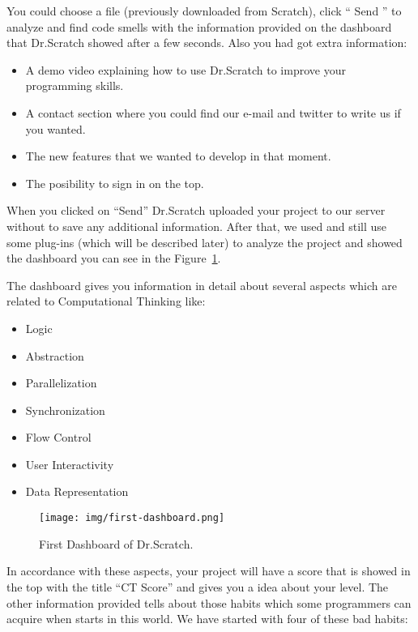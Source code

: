 \documentclass[a4paper, 12pt]{book}
\begin{document}
You could choose a file (previously downloaded from Scratch), click
`` Send '' to analyze and find code smells with the information 
provided on the dashboard that Dr.Scratch showed  after a few seconds.
Also you had got extra information:

\begin{itemize}
   	\item A demo video explaining how to use Dr.Scratch to improve your 
   	programming skills.
   	\item A contact section where you could find our e-mail and twitter to write
   	us if you wanted.
	\item The new features that we wanted to develop in that moment.
	\item The posibility to sign in on the top.
\end{itemize}

When you clicked on ``Send'' Dr.Scratch uploaded your project to our server
without to save any additional information. After that, we used and
still use some plug-ins (which will be described later) to analyze the 
project and showed the dashboard you can see in the 
Figure~\ref{figure:first-dashboard}.

The dashboard gives you information in detail about several aspects which are
related to Computational Thinking like: 

\begin{itemize}
   	\item Logic
   	\item Abstraction
	\item Parallelization
	\item Synchronization
	\item Flow Control
	\item User Interactivity
	\item Data Representation
\end{itemize}

\begin{figure}
   	\centering
   	\texttt{[image: img/first-dashboard.png]}
   	\caption{First Dashboard of Dr.Scratch.}
   	\label{figure:first-dashboard}
\end{figure}


In accordance with these aspects, your project will have a score that is showed
in the top with the title ``CT Score'' and gives you a idea about your level.
The other information provided tells about those habits which some programmers
can acquire when starts in this world. We have started with four of these bad
habits:
\end{document}
